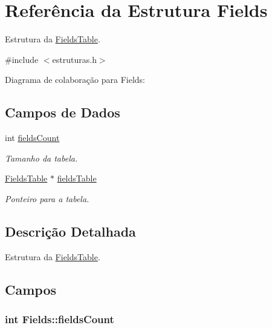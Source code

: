 \hypertarget{struct_fields}{}\section{Referência da Estrutura Fields}
\label{struct_fields}


Estrutura da \hyperlink{struct_fields_table}{Fields\+Table}.  




{\ttfamily \#include $<$estruturas.\+h$>$}



Diagrama de colaboração para Fields\+:
\subsection*{Campos de Dados}
\begin{DoxyCompactItemize}
\item 
int \hyperlink{struct_fields_a48a4d89fd6f0f586e7b34265f1bacc67}{fields\+Count}
\begin{DoxyCompactList}\small\item\em Tamanho da tabela. \end{DoxyCompactList}\item 
\hyperlink{struct_fields_table}{Fields\+Table} $\ast$ \hyperlink{struct_fields_a6ec79b0bb356e60d228bce5980680779}{fields\+Table}
\begin{DoxyCompactList}\small\item\em Ponteiro para a tabela. \end{DoxyCompactList}\end{DoxyCompactItemize}


\subsection{Descrição Detalhada}
Estrutura da \hyperlink{struct_fields_table}{Fields\+Table}. 

\subsection{Campos}
\subsubsection[{\texorpdfstring{fields\+Count}{fieldsCount}}]{\setlength{\rightskip}{0pt plus 5cm}int Fields\+::fields\+Count}\hypertarget{struct_fields_a48a4d89fd6f0f586e7b34265f1bacc67}{}\label{struct_fields_a48a4d89fd6f0f586e7b34265f1bacc67}


